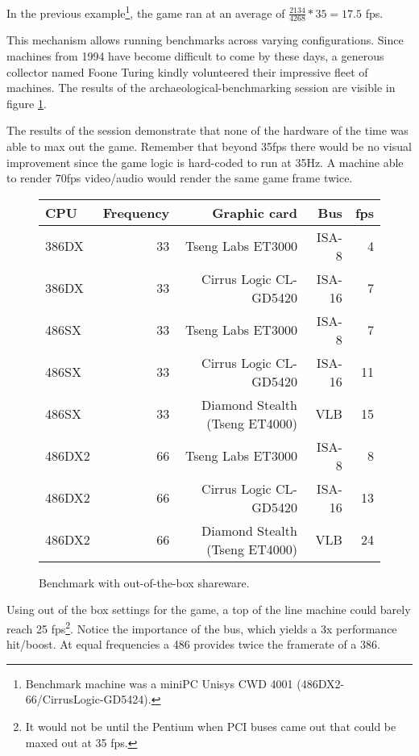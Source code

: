  
In the previous example\footnote{Benchmark machine was a miniPC Unisys CWD 4001 (486DX2-66/CirrusLogic-GD5424).}, the game ran at an average of $\frac{2134}{4268}*35 = 17.5$ fps. \\
\par
This mechanism allows running benchmarks across varying configurations. Since machines from 1994 have become difficult to come by these days, a generous collector named Foone Turing kindly volunteered their impressive fleet of machines. The results of the archaeological-benchmarking session are visible in figure \ref{bnechmarsks}.\\
\par
 The results of the session demonstrate that none of the hardware of the time was able to max out the game. Remember that beyond 35fps there would be no visual improvement since the game logic is hard-coded to run at 35Hz. A machine able to render 70fps video/audio would render the same game frame twice.\\
\par
\begin{figure}[H]
\centering  
\begin{tabularx}{\textwidth}{ L{1}  R{0.3} R{2.4} R{1} R{0.3} }
  \toprule
   \textbf{CPU} & \textbf{Frequency} & \textbf{Graphic card} & \textbf{Bus} & \textbf{fps}\\
  \toprule 
  386DX & 33 & Tseng Labs ET3000    & ISA-8  &  4\\
  386DX\protect\footnotemark & 33 & Cirrus Logic CL-GD5420 & ISA-16 &  7\\
  \toprule 
  486SX & 33 & Tseng Labs ET3000                & ISA-8  &  7\\
  486SX & 33 & Cirrus Logic CL-GD5420           & ISA-16 & 11\\ 
  486SX & 33 & Diamond Stealth (Tseng ET4000)   & VLB    & 15\\
  \toprule 
  486DX2 & 66 & Tseng Labs ET3000               & ISA-8  &  8\\
  486DX2 & 66 & Cirrus Logic CL-GD5420          & ISA-16 & 13\\
  486DX2 & 66 & Diamond Stealth (Tseng ET4000)  & VLB    & 24\\
   \toprule
 \end{tabularx}
\caption{Benchmark with out-of-the-box \doom{} shareware.}
\label{bnechmarsks}
\end{figure}\label{benchmarks}
\par
Using out of the box settings for the game, a top of the line machine could barely reach 25 fps\footnote{It would not be until the Pentium when PCI buses came out that \doom{} could be maxed out at 35 fps.}. Notice the importance of the bus, which yields a 3x performance hit/boost. At equal frequencies a 486 provides twice the framerate of a 386.\\
\par






